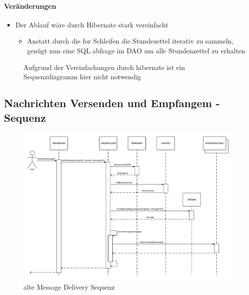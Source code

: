         \paragraph{Veränderungen}
        \begin{itemize}
            \item Der Ablauf wäre durch Hibernate stark vereinfacht
            \begin{itemize}
                \item Anstatt durch die for Schleifen die Stundezettel iterativ zu sammeln, genügt nun eine SQL abfrage im DAO um alle Stundenzettel zu erhalten
            \end{itemize}
        \end{itemize}

        \begin{figure}
          \centering
           \caption{Aufgrund der Vereinfachungen durch hibernate ist ein Sequenzdiagramm hier nicht notwendig}
        \end{figure}

        \subsection{Nachrichten Versenden und Empfangem - Sequenz}

            \begin{figure}
              \centering
                \includegraphics[width=\linewidth]{Message-Delivery.pdf}
               \caption{alte Message Delivery Sequenz}
            \end{figure}

